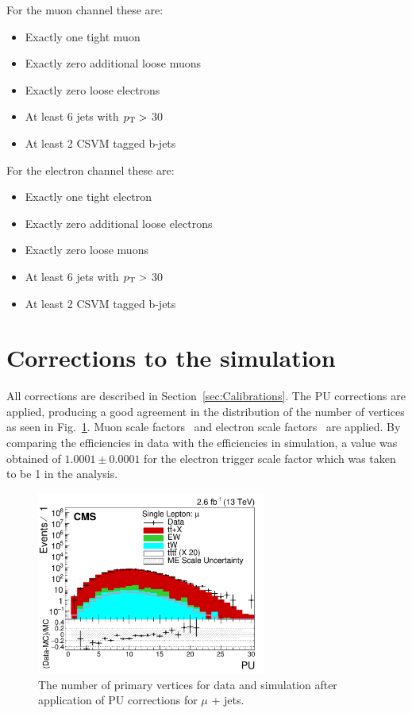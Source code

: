 For the muon channel these are:
\begin{itemize}
\setlength\itemsep{0em}
\item Exactly one tight muon
\item Exactly zero additional loose muons
\item Exactly zero loose electrons
\item At least 6 jets with $p_{\mathrm{T}} >$ 30 \GeV
\item At least 2 CSVM tagged b-jets
\end{itemize}
For the electron channel these are:
\begin{itemize}
\itemsep0em 
\item Exactly one tight electron
\item Exactly zero additional loose electrons
\item Exactly zero loose muons
\item At least 6 jets with $p_{\mathrm{T}} >$ 30 \GeV
\item At least 2 CSVM tagged b-jets
\end{itemize}

\section{Corrections to the simulation}
\label{sec:Calibrations13}
All corrections are described in Section~\ref{sec:Calibrations}. The PU corrections are applied, producing a good agreement in the distribution of the number of vertices as seen in Fig.~\ref{fig:PUReWeight13}. Muon scale factors~\cite{muonSFtwiki} and electron scale factors~\cite{electronSFtwiki} are applied. By comparing the efficiencies in data with the efficiencies in simulation, a value was obtained of $1.0001\pm0.0001$ for the electron trigger scale factor which was taken to be 1 in the analysis. 

\begin{figure}[h!]
\begin{center}
\includegraphics[width=0.67\textwidth]{images/Run2/PU_StackLogY.pdf}
\end{center}
\caption{The number of primary vertices for data and simulation after application of PU corrections for $\mu$ + jets.}
\label{fig:PUReWeight13}
\end{figure}

